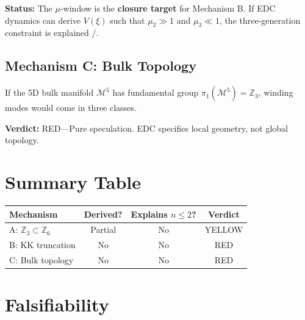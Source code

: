 \textbf{Status:} The $\mu$-window is the \textbf{closure target} for Mechanism B.
If EDC dynamics can derive $V(\xi)$ such that $\mu_2 \gg 1$ and $\mu_3 \ll 1$,
the three-generation constraint is explained \tagP{}/\tagOpen{}.

\subsection{Mechanism C: Bulk Topology}

If the 5D bulk manifold $\mathcal{M}^5$ has fundamental group $\pi_1(\mathcal{M}^5) = \mathbb{Z}_3$,
winding modes would come in three classes.

\textbf{Verdict:} RED---Pure speculation. EDC specifies local geometry, not global topology.

\section{Summary Table}
\label{sec:gen_summary}

\begin{center}
\begin{tabular}{lccc}
\toprule
\textbf{Mechanism} & \textbf{Derived?} & \textbf{Explains $n \leq 2$?} & \textbf{Verdict} \\
\midrule
A: $\mathbb{Z}_3 \subset \mathbb{Z}_6$ & Partial \tagI{} & No & YELLOW \\
B: KK truncation & No \tagP{} & No & RED \\
C: Bulk topology & No \tagP{} & No & RED \\
\bottomrule
\end{tabular}
\end{center}

\section{Falsifiability}
\label{sec:gen_falsify}

